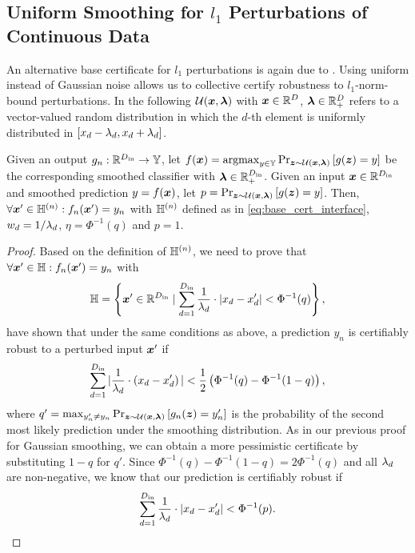\subsection{Uniform Smoothing for \texorpdfstring{$l_1$}{l1} Perturbations of Continuous Data}
An alternative base certificate for $l_1$ perturbations is again due to \citet{Eiras2021}.
Using uniform instead of Gaussian noise allows us to collective certify robustness to $l_1$-norm-bound perturbations.
In the following $\mathcal{U}({\bm{x}}, {\bm{\lambda}})$ with ${\bm{x}} \in {\mathbb{R}}^{D}$, ${\bm{\lambda}} \in {\mathbb{R}}_+^D$ refers to a vector-valued random distribution in which the $d$-th element is uniformly distributed in
$\left[{x}_d - {\lambda}_d, {x}_d + {\lambda}_d\right]$.
\begin{proposition}\label{prop:uniform_smoothing}
Given an output $g_n : {\mathbb{R}}^{D_\mathrm{in}} \rightarrow {\mathbb{Y}}$, let 
$f({\bm{x}}) = \mathrm{argmax}_{y \in {\mathbb{Y}}} \Pr_{{\bm{z}} \sim \mathcal{U}({\bm{x}}, {\bm{\lambda}})}\left[g({\bm{z}}) = y\right]$ be the corresponding smoothed classifier with ${\bm{\lambda}} \in {\mathbb{R}}_+^{D_\mathrm{in}}$.
Given an input ${\bm{x}} \in {\mathbb{R}}^{D_\mathrm{in}}$ and smoothed prediction $y = f({\bm{x}})$, 
let $p = \Pr_{{\bm{z}} \sim \mathcal{U}({\bm{x}}, {\bm{\lambda}})}\left[g({\bm{z}}) = y\right]$.
Then, $\forall {\bm{x}}' \in {\mathbb{H}}^{(n)}: f_n({\bm{x}}') = {y}_n$ with ${\mathbb{H}}^{(n)}$ defined as in \autoref{eq:base_cert_interface},
${w}_{d} = 1 / {\lambda}_d$,
$\eta = \Phi^{-1}(q)$
and
$p=1$.
\end{proposition}
\begin{proof}
Based on the definition of ${\mathbb{H}}^{(n)}$, we need to prove that $\forall {\bm{x}}' \in {\mathbb{H}} : f_n({\bm{x}}') = y_n$ with
\begin{equation}
    {\mathbb{H}} = \left\{ {\bm{x}}' \in {\mathbb{R}}^{D_\mathrm{in}} \mid
        \sum_{d=1}^{D_\mathrm{in}}
            \frac{1}{{\lambda}_d} \cdot | {x}_d - {x}'_d | <  \Phi^{-1}(q)
    \right\},
\end{equation}
\citet{Eiras2021} have shown that under the same conditions as above, a prediction $y_n$ is certifiably robust to a perturbed input ${\bm{x}}'$ if 
\begin{equation}
    \sum_{d=1}^{D_\mathrm{in}}
            | \frac{1}{{\lambda}_d} \cdot  \left({x}_d - {x}'_d\right) |  
            < \frac{1}{2}
    \left(
        \Phi^{-1}(q) - \Phi^{-1}(1 - q)
    \right),
\end{equation}
where $q' = \max_{{y}_n' \neq {y}_n} \Pr_{{\bm{z}} \sim \mathcal{U}({\bm{x}}, {\bm{\lambda}})}\left[g_n({\bm{z}}) = {y}'_n \right]$ is the probability of the second most likely prediction under the smoothing distribution.
As in our previous proof for Gaussian smoothing, we can obtain a more pessimistic certificate by substituting $1 - q$ for $q'$.  
Since $\Phi^{-1}(q) - \Phi^{-1}(1 - q) = 2 \Phi^{-1}(q)$ and 
all ${\lambda}_d$ are non-negative, we know that our prediction is certifiably robust if
\begin{equation}
    \sum_{d=1}^{D_\mathrm{in}}
            \frac{1}{{\lambda}_d} \cdot | {x}_d - {x}'_d | <  \Phi^{-1}(p).
\end{equation}
\end{proof}

